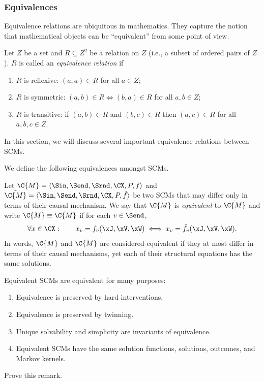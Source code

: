 \subsubsection{Equivalences}

Equivalence relations are ubiquitous in mathematics. They capture the notion that mathematical objects can be ``equivalent'' 
from some point of view.
\begin{Def}
  Let $Z$ be a set and $R \subseteq Z^2$ be a relation on $Z$ (i.e., a subset of ordered pairs of $Z$). $R$ is called an \emph{equivalence relation} if 
  \begin{enumerate}
    \item $R$ is reflexive: $(a,a) \in R$ for all $a \in Z$;
    \item $R$ is symmetric: $(a,b) \in R \iff (b,a) \in R$ for all $a,b \in Z$;
    \item $R$ is transitive: if $(a,b) \in R$ and $(b,c) \in R$ then $(a,c) \in R$ for all $a,b,c\in Z$.
  \end{enumerate}
\end{Def}
In this section, we will discuss several important equivalence relations between SCMs.

We define the following equivalences amongst SCMs.
\begin{Def}
  Let $\C{M} = \langle \Sin, \Send, \Srnd, \CX, P, f \rangle$ and
  $\tilde{\C{M}} = \langle \Sin, \Send, \Srnd, \CX, P, \tilde{f} \rangle$ be two SCMs that may
  differ only in terms of their causal mechanism. We say that
  $\C{M}$ is \emph{equivalent} to $\tilde{\C{M}}$ and write $\C{M} \equiv \tilde{\C{M}}$ if for each $v \in \Send$,
  $$\forall x \in \CX: \qquad x_v = f_v(\xJ,\xV,\xW) \iff x_v = \tilde{f}_v(\xJ,\xV,\xW).$$
  In words, $\C{M}$ and $\tilde{\C{M}}$ are considered equivalent if they at most differ in terms of their
  causal mechanisms, yet each of their structural equations has the same solutions.
\end{Def}
\begin{Rem}
Equivalent SCMs are equivalent for many purposes:
\begin{enumerate}
  \item Equivalence is preserved by hard interventions.
  \item Equivalence is preserved by twinning.
  \item Unique solvability and simplicity are invariants of equivalence.
  \item Equivalent SCMs have the same solution functions, solutions, outcomes, and Markov kernels.
\end{enumerate}
\end{Rem}
\begin{Exc}
  Prove this remark.
\end{Exc}

